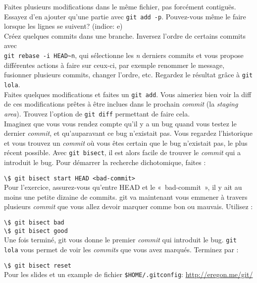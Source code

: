 \documentclass[a4paper,11pt]{article}
\newcommand{\code}[1]{\lstinline{#1}}
\newcommand{\shell}[1]{\hspace*{1cm}\lstinline{\$ #1}\\}
\begin{document}
Faites plusieurs modifications dans le même fichier, pas forcément contiguës. Essayez d'en ajouter qu'une partie avec \code{git add -p}. Pouvez-vous même le faire lorsque les lignes se suivent? (indice: e) \\

Créez quelques commits dans une branche. Inversez l'ordre de certains commits avec\\
\code{git rebase -i HEAD~n}, qui sélectionne les \textit{n} derniers commits et vous propose différentes actions à faire sur ceux-ci, par exemple renommer le message, fusionner plusieurs commits, changer l'ordre, etc. Regardez le résultat grâce à \code{git lola}. \\

Faites quelques modifications et faites un \code{git add}. Vous aimeriez bien voir la diff de ces modifications prêtes à être inclues dans le prochain \emph{commit} (la \textit{staging area}). Trouvez l'option de \code{git diff} permettant de faire cela. \\

Imaginez que vous vous rendez compte qu'il y a un bug quand vous testez le dernier \emph{commit}, et qu'auparavant ce bug n'existait pas. Vous regardez l'historique et vous trouvez un \emph{commit} où vous êtes certain que le bug n'existait pas, le plus récent possible. Avec \code{git bisect}, il est alors facile de trouver le \emph{commit} qui a introduit le bug. Pour démarrer la recherche dichotomique, faites :

\shell{git bisect start HEAD <bad-commit>}

Pour l'exercice, assurez-vous qu'entre HEAD et le «~bad-commit~», il y ait au moins une petite dizaine de commits. git va maintenant vous emmener à travers plusieurs \emph{commit} que vous allez devoir marquer comme bon ou mauvais. Utilisez :

\shell{git bisect bad}
\shell{git bisect good}

Une fois terminé, git vous donne le premier \emph{commit} qui introduit le bug. \code{git lola} vous permet de voir les \emph{commits} que vous avez marqués. Terminez par :

\shell{git bisect reset}

Pour les slides et un example de fichier \code{$HOME/.gitconfig}: \url{http://eregon.me/git/}
\end{document}
